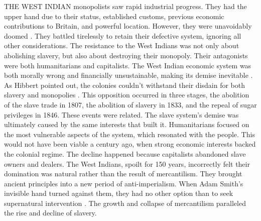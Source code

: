 THE WEST INDIAN monopolists saw rapid industrial progress. They had the upper hand due to their status, established customs, previous economic contributions to Britain, and powerful location. However, they were unavoidably doomed . They battled tirelessly to retain their defective system, ignoring all other considerations. The resistance to the West Indians was not only about abolishing slavery, but also about destroying their monopoly. Their antagonists were both humanitarians and capitalists. The West Indian economic system was both morally wrong and financially unsustainable, making its demise inevitable . As Hibbert pointed out, the colonies couldn't withstand their disdain for both slavery and monopolies . This opposition occurred in three stages, the abolition of the slave trade in 1807, the abolition of slavery in 1833, and the repeal of sugar privileges in 1846. These events were related. The slave system's demise was ultimately caused by the same interests that built it. Humanitarians focused on the most vulnerable aspects of the system, which resonated with the people. This would not have been viable a century ago, when strong economic interests backed the colonial regime. The decline happened because capitalists abandoned slave owners and dealers. The West Indians, spoilt for 150 years, incorrectly felt their domination was natural rather than the result of mercantilism. They brought ancient principles into a new period of anti-imperialism. When Adam Smith's invisible hand turned against them, they had no other option than to seek supernatural intervention . The growth and collapse of mercantilism paralleled the rise and decline of slavery.
